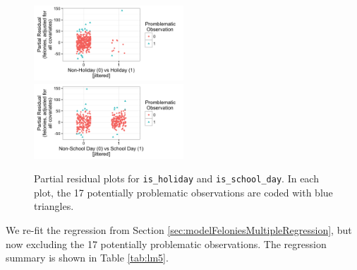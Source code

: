 \documentclass[11pt,notitlepage]{article}
\newenvironment{codeSmall}%
   {\par\noindent\adjustbox{margin=1ex,bgcolor=shadecolor,margin=0ex \medskipamount}\bgroup\minipage\linewidth\verbatim\footnotesize}%
   {\endverbatim\endminipage\egroup}
\begin{document}
\begin{figure}[!h]
  \vspace*{-3mm}
  \centering
  \captionsetup{width=0.9\textwidth}
  \subfloat%
  		{\includegraphics[width=0.5\textwidth]
  		{figures/lm4PresIsHoliday.png}\label{fig:lm4PresIsHoliday}}
  \hfill
  \subfloat%
  		{\includegraphics[width=0.5\textwidth]
  		{figures/lm4PresIsSchoolDay.png}\label{fig:lm4PresIsSchoolDay}}
  \vspace*{-3mm}
  \caption{Partial residual plots for \texttt{is_holiday} and \texttt{is_school_day}. In each plot, the 17 potentially problematic observations are coded with blue triangles.}
  \label{fig:lm4Pres}
  \vspace*{-3mm}
\end{figure}




We re-fit the regression from Section \ref{sec:modelFeloniesMultipleRegression}, but now excluding the 17 potentially problematic observations. The regression summary is shown in Table \ref{tab:lm5}.

\end{document}
